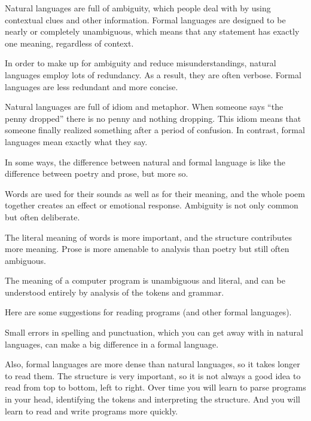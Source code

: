 \begin{description}

Natural languages are full of ambiguity, which people deal with by using contextual clues and other information.
Formal languages are designed to be nearly or completely unambiguous, which means that any statement has exactly one meaning, regardless of context.

In order to make up for ambiguity and reduce misunderstandings, natural languages employ lots of redundancy.
As a result, they are often verbose.
Formal languages are less redundant and more concise.

Natural languages are full of idiom and metaphor.
When someone says ``the penny dropped'' there is no penny and nothing dropping.
This idiom means that someone finally realized something after a period of confusion.
In contrast, formal languages mean exactly what they say.

\end{description}

In some ways, the difference between natural and formal language is like the difference between poetry and prose, but more so.

\begin{description}

Words are used for their sounds as well as for their meaning, and the whole poem together creates an effect or emotional response.
Ambiguity is not only common but often deliberate.

The literal meaning of words is more important, and the structure contributes more meaning.
Prose is more amenable to analysis than poetry but still often ambiguous.

The meaning of a computer program is unambiguous and literal, and can be understood entirely by analysis of the tokens and grammar.

\end{description}

Here are some suggestions for reading programs (and other formal languages).

Small errors in spelling and punctuation, which you can get away with in natural languages, can make a big difference in a formal language.

Also, formal languages are more dense than natural languages, so it takes longer to read them.
The structure is very important, so it is not always a good idea to read from top to bottom, left to right.
Over time you will learn to parse programs in your head, identifying the tokens and interpreting the structure.
And you will learn to read and write programs more quickly.


